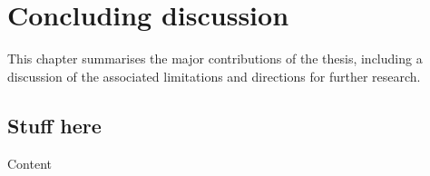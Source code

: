 
\chapter{Concluding discussion}\label{c:conclusions}


This chapter summarises the major contributions of the thesis, including a discussion of the associated limitations and directions for further research.



\section{Stuff here}

Content

